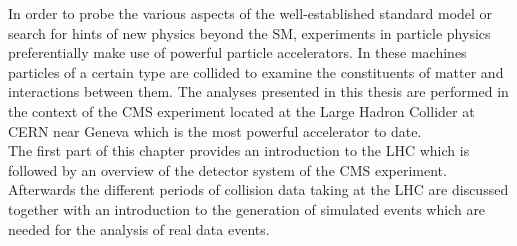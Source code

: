 In order to probe the various aspects of the well-established standard model or search for hints of new physics beyond the SM, experiments in particle physics preferentially make use of powerful particle accelerators. In these machines particles of a certain type are collided to examine the constituents of matter and interactions between them. The analyses presented in this thesis are performed in the context of the CMS experiment located at the Large Hadron Collider at CERN near Geneva which is the most powerful accelerator to date. \\ 
The first part of this chapter provides an introduction to the LHC which is followed by an overview of the detector system of the CMS experiment. Afterwards the different periods of collision data taking at the LHC are discussed together with an introduction to the generation of simulated events which are needed for the analysis of real data events.  
